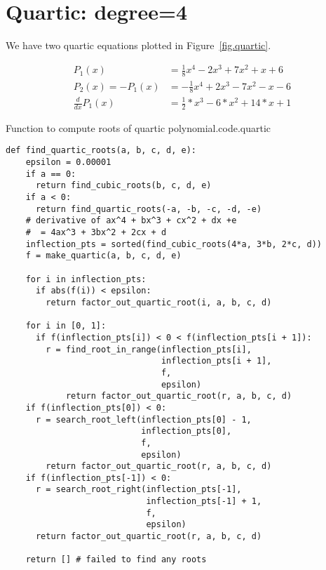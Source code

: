 \section{Quartic: degree=4}
\label{sec.quartic}



We have two quartic equations plotted in Figure~\ref{fig.quartic}.


\begin{align*}
  P_1(x) &= \frac{1}{8}  x^4 -2 x^3 + 7  x^2 + x + 6\\
  P_2(x) = -P_1(x) &= -\frac{1}{8}  x^4 +2 x^3 - 7  x^2 - x - 6\\
  \frac{d}{dx} P_1(x) &= \frac{1}{2} * x^3 -6* x^2 + 14 * x + 1
\end{align*}


\begin{listing}{Function to compute roots of quartic polynomial.}{code.quartic}
\begin{minipage}[c]{0.98\textwidth}\begin{lstlisting}
def find_quartic_roots(a, b, c, d, e):
    epsilon = 0.00001
    if a == 0:
      return find_cubic_roots(b, c, d, e)
    if a < 0:
      return find_quartic_roots(-a, -b, -c, -d, -e)
    # derivative of ax^4 + bx^3 + cx^2 + dx +e
    #  = 4ax^3 + 3bx^2 + 2cx + d
    inflection_pts = sorted(find_cubic_roots(4*a, 3*b, 2*c, d))
    f = make_quartic(a, b, c, d, e)

    for i in inflection_pts:
      if abs(f(i)) < epsilon:
        return factor_out_quartic_root(i, a, b, c, d)

    for i in [0, 1]:
      if f(inflection_pts[i]) < 0 < f(inflection_pts[i + 1]):
        r = find_root_in_range(inflection_pts[i],
                               inflection_pts[i + 1],
                               f,
                               epsilon)
            return factor_out_quartic_root(r, a, b, c, d)
    if f(inflection_pts[0]) < 0:
      r = search_root_left(inflection_pts[0] - 1, 
                           inflection_pts[0],
                           f,
                           epsilon)
        return factor_out_quartic_root(r, a, b, c, d)
    if f(inflection_pts[-1]) < 0:
      r = search_root_right(inflection_pts[-1],
                            inflection_pts[-1] + 1, 
                            f, 
                            epsilon)
      return factor_out_quartic_root(r, a, b, c, d)

    return [] # failed to find any roots
\end{lstlisting}\end{minipage}\end{listing}
